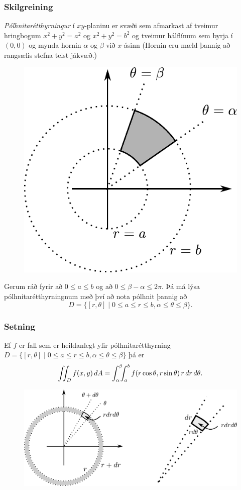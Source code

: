 \subsubsection{Skilgreining }
 {\em Pólhnitarétthyrningur} í $xy$-planinu
er svæði sem afmarkast af tveimur hringbogum $x^2+y^2=a^2$ og
$x^2+y^2=b^2$ og tveimur hálflínum sem byrja í $(0,0)$ og mynda hornin
$\alpha$ og $\beta$ við $x$-ásinn (Hornin eru mæld þannig að rangsælis
stefna telst jákvæð.) 
\begin {figure}[h!]
 \centering
            \includegraphics[width=0.35\linewidth]{polarrett}
	\caption*{}
\end {figure}
Gerum ráð fyrir að $0\leq a\leq b$ og að $0\leq\beta-\alpha\leq
2\pi$.  Þá má lýsa pólhnitarétthyrningnum með því  að nota pólhnit
þannig að 
$$D=\{[r,\theta]\mid 0\leq a\leq r\leq b, \alpha\leq \theta\leq\beta\}.$$
 



\subsubsection{Setning }
Ef $f$ er fall sem er heildanlegt yfir 
pólhnitarétthyrning
$D=\{[r,\theta]\mid 0\leq a\leq r\leq b, \alpha\leq \theta\leq\beta\}$
þá er 
$$\int\!\!\!\int_D f(x,y)\,dA=\int_\alpha^\beta\!\!\!\int_{a}^{b}
f(r\cos\theta,r\sin\theta)\,r\,dr\, d\theta.$$

\begin {figure}[h!]
 \centering
            \includegraphics[width=0.85\linewidth]{polarelement}
	\caption*{}
\end {figure}

